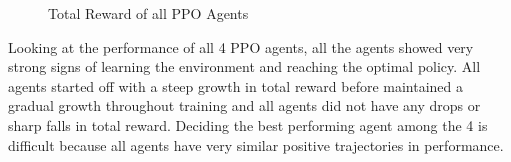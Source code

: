\begin{figure}[H]
    \centering
    \caption{Total Reward of all PPO Agents}
    \label{fig:PPO_total_reward}
\end{figure}

Looking at the performance of all 4 PPO agents, all the agents showed very strong signs of learning the environment and reaching the optimal policy. All agents started off with a steep growth in total reward before maintained a gradual growth throughout training and all agents did not have any drops or sharp falls in total reward. Deciding the best performing agent among the 4 is difficult because all agents have very similar positive trajectories in performance. 

